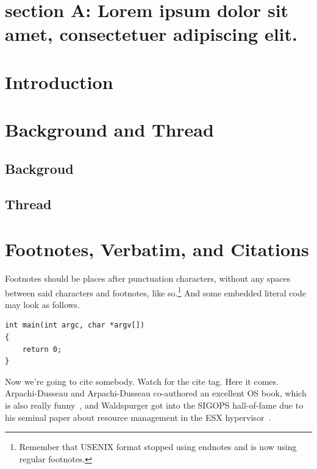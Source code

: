 \section{section A: Lorem ipsum dolor sit amet, consectetuer adipiscing elit.}
\lipsum[1]

\section{Introduction}
\lipsum[2-3]

\section{Background and Thread}
\lipsum[4-5]

\subsection{Backgroud}
\lipsum[6-7]

\subsection{Thread}
\lipsum[6-7]

\section{Footnotes, Verbatim, and Citations}

Footnotes should be places after punctuation characters, without any spaces between said characters and footnotes, like so.\footnote{Remember that USENIX format stopped using endnotes and is now using regular footnotes.} And some embedded literal code may look as follows.\par

\begin{verbatim}
int main(int argc, char *argv[]) 
{
    return 0;
}
\end{verbatim}

Now we're going to cite somebody. Watch for the cite tag. Here it comes. Arpachi-Dusseau and Arpachi-Dusseau co-authored an excellent OS book, which is also really funny~\cite{arpachiDusseau18:osbook}, and Waldspurger got into the SIGOPS hall-of-fame due to his seminal paper about resource management in the ESX hypervisor~\cite{waldspurger02}.\par

